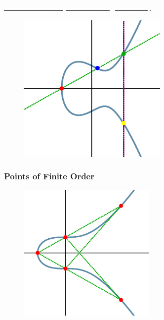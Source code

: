 \begin{frame} \frametitle{\href{https://cgmcwhor.expressions.syr.edu/wp-content/uploads/2019/10/curve.mp4}{\textcolor{white}{Addition Law (Chord-Tangent Law)}}}
	\begin{figure}[h]
	\centering
	\includegraphics[width=0.65\textwidth]{images/ec_add.eps}
	\end{figure}
\end{frame}





\begin{frame} \frametitle{Points of Finite Order}
	\begin{figure}[!ht]
	\centering
	\includegraphics[width=0.6\textwidth]{images/ec5.eps}
	\end{figure}
\end{frame}





